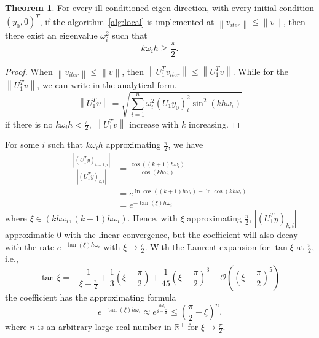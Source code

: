 \documentclass[11pt,fceqn]{article}
\numberwithin{equation}{section}
\theoremstyle{definition}
\newtheorem{thm}{Theorem}[section]
\begin{document}
\begin{thm}
For every ill-conditioned eigen-direction, with every initial condition $(y_{0},0)^{T}$, if the algorithm~\ref{alg:local} is implemented at $\left\|v_{iter}\right\| \leq \left\|v\right\|$, then there exist an eigenvalue $\omega_{i}^{2}$ such that 
$$k\omega_{i} h \geq \frac{\pi}{2}.$$
\end{thm}
\begin{proof}
When $\left\|v_{iter}\right\| \leq \left\|v\right\|$, then $\left\|U_{1}^{T}v_{iter}\right\| \leq \left\|U_{1}^{T}v\right\|$. While for the $\left\|U_{1}^{T}v\right\|$, we can write in the analytical form, 
$$
\left\|U_{1}^{T}v\right\| = \sqrt{\sum_{i=1}^{n} \omega_{i}^{2}(U_{1}y_{0})_{i}^{2}\sin^{2}(kh\omega_{i})}
$$
if there is no $k\omega_{i} h < \frac{\pi}{2}$, $\left\|U_{1}^{T}v\right\|$ increase with $k$ increasing.
\end{proof}

For some $i$ such that $k\omega_{i}h$ approximating $\frac{\pi}{2}$, we have
\begin{equation}
\label{eqn:decayrapid}
\begin{aligned}
\frac{\left|(U_{1}^{T}y)_{k+1,i}\right|}{\left|(U_{1}^{T}y)_{k,i}\right|} & = \frac{\cos\left((k+1)h\omega_{i}\right)}{\cos\left(kh\omega_{i}\right)} \\
                                                                                                        & = e^{\ln\cos\left((k+1)h\omega_{i}\right) - \ln \cos\left(kh\omega_{i}\right) } \\
                                                                                                        & = e^{-\tan(\xi) h\omega_{i}}
\end{aligned}
\end{equation}
where $\xi \in \left(kh\omega_{i}, (k+1)h\omega_{i}\right)$. Hence, with $\xi$ approximating $\frac{\pi}{2}$, $\left|(U_{1}^{T}y)_{k,i}\right|$ approximatie $0$ with the linear convergence, but the coefficient will also decay with the rate $e^{-\tan(\xi) h\omega_{i}}$ with $\xi \rightarrow \frac{\pi}{2}$. With the Laurent expansion for $\tan \xi$ at $\frac{\pi}{2}$, i.e.,
$$
\tan \xi = -\frac{1}{\xi - \frac{\pi}{2}} +\frac{1}{3} \left(\xi - \frac{\pi}{2}\right) + \frac{1}{45} \left(\xi - \frac{\pi}{2}\right)^{3} + \mathcal{O}\left(\left(\xi - \frac{\pi}{2}\right)^{5}\right)
$$  
the coefficient has the approximating formula
$$ 
e^{-\tan(\xi) h\omega_{i}} \approx e^{ \frac{h\omega_{i}}{\xi - \frac{\pi}{2}}} \leq \left(\frac{\pi}{2} -\xi \right)^{n}.
$$
where $n$ is an arbitrary large real number in $\mathbb{R}^{+}$ for $\xi \rightarrow \frac{\pi}{2}$. 
\end{document}
